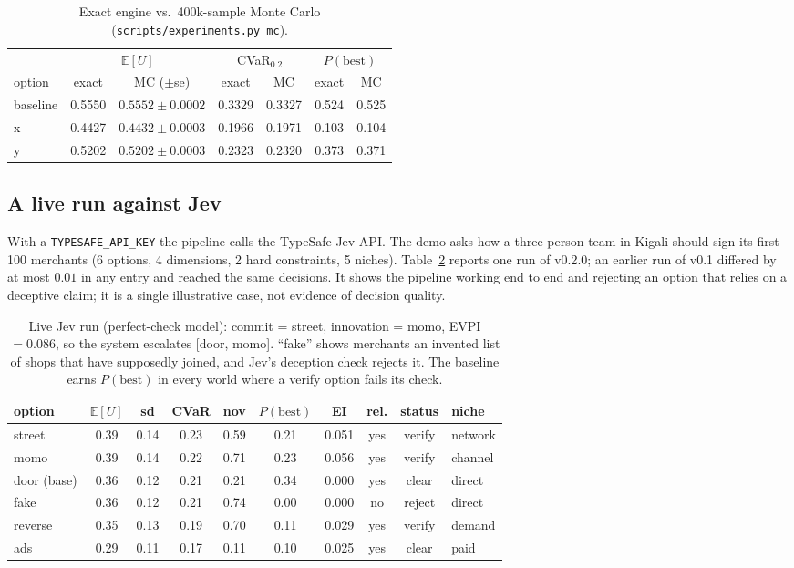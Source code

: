 \documentclass[11pt]{article}
\theoremstyle{definition}
\begin{document}
\begin{table}[h]
\centering\small
\begin{tabular}{@{}lcccccc@{}}
\toprule
& \multicolumn{2}{c}{$\mathbb{E}[U]$} & \multicolumn{2}{c}{CVaR$_{0.2}$} & \multicolumn{2}{c}{$P(\mathrm{best})$} \\
option & exact & MC ($\pm$se) & exact & MC & exact & MC \\
\midrule
baseline & 0.5550 & $0.5552\pm0.0002$ & 0.3329 & 0.3327 & 0.524 & 0.525 \\
x & 0.4427 & $0.4432\pm0.0003$ & 0.1966 & 0.1971 & 0.103 & 0.104 \\
y & 0.5202 & $0.5202\pm0.0003$ & 0.2323 & 0.2320 & 0.373 & 0.371 \\
\bottomrule
\end{tabular}
\caption{Exact engine vs.\ 400k-sample Monte Carlo (\texttt{scripts/experiments.py mc}).}
\label{tab:oracle}
\end{table}

\subsection{A live run against Jev}

With a \texttt{TYPESAFE\_API\_KEY} the pipeline calls the TypeSafe Jev API. The demo asks how a
three-person team in Kigali should sign its first 100 merchants (6 options, 4 dimensions, 2 hard
constraints, 5 niches). Table~\ref{tab:demo} reports one run of v0.2.0; an earlier run of v0.1
differed by at most $0.01$ in any entry and reached the same decisions. It shows the pipeline
working end to end and rejecting an option that relies on a deceptive claim; it is a single
illustrative case, not evidence of decision quality.

\begin{table}[h]
\centering\small
\setlength{\tabcolsep}{4.5pt}
\begin{tabular}{@{}lccccccccl@{}}
\toprule
option & $\mathbb{E}[U]$ & sd & CVaR & nov & $P(\mathrm{best})$ & EI & rel. & status & niche \\
\midrule
street & 0.39 & 0.14 & 0.23 & 0.59 & 0.21 & 0.051 & yes & verify & network \\
momo & 0.39 & 0.14 & 0.22 & 0.71 & 0.23 & 0.056 & yes & verify & channel \\
door (base) & 0.36 & 0.12 & 0.21 & 0.21 & 0.34 & 0.000 & yes & clear & direct \\
fake & 0.36 & 0.12 & 0.21 & 0.74 & 0.00 & 0.000 & no & reject & direct \\
reverse & 0.35 & 0.13 & 0.19 & 0.70 & 0.11 & 0.029 & yes & verify & demand \\
ads & 0.29 & 0.11 & 0.17 & 0.11 & 0.10 & 0.025 & yes & clear & paid \\
\bottomrule
\end{tabular}
\caption{Live Jev run (perfect-check model): commit = street, innovation = momo, EVPI $=0.086$, so
the system escalates [door, momo]. ``fake'' shows merchants an invented list of shops that have
supposedly joined, and Jev's deception check rejects it. The baseline earns $P(\mathrm{best})$ in
every world where a verify option fails its check.}
\label{tab:demo}
\end{table}
\end{document}
